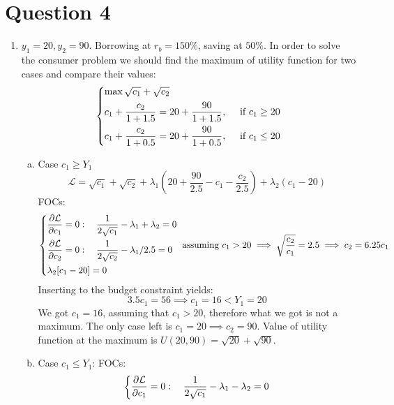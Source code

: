 \documentclass[11pt, oneside]{article}
\begin{document}
\clearpage
\section*{Question 4}
\begin{enumerate}[(1)] 
	\item $ y_{1} = 20, y_{2} = 90 $. Borrowing at $ r_{b} = 150\%$, saving at $ 50\% $.
	In order to solve the consumer problem we should find the maximum of utility function for two cases and compare their values:
	\[
	\begin{dcases}
		\max \sqrt{c_{1}} + \sqrt{c_{2}} \\
		c_{1} + \frac{c_{2}}{1+1.5} = 20 + \frac{90}{1+1.5}, \quad \text{ if } c_{1} \ge 20 \\
		c_{1} + \frac{c_{2}}{1+0.5} = 20 + \frac{90}{1+0.5}, \quad \text{ if } c_{1} \le 20
	\end{dcases} 
	\]
	\begin{enumerate}[(a)]
		\item Case $ c_{1} \ge Y_{1} $
		\[
		\mathcal{L} = \sqrt{c_{1}} + \sqrt{c_{2}} + \lambda_{1} \left( 20 + \frac{90}{2.5} - c_{1} - \frac{c_{2}}{2.5}  \right) + \lambda_{2}(c_{1} - 20)
		\]
		FOCs:
		\[
		\begin{dcases}
			\frac{\partial \mathcal{L}}{\partial c_{1}} = 0: \quad \frac{1}{2\sqrt{c_{1}}} - \lambda_{1} + \lambda_{2} = 0
			\\
			\frac{\partial \mathcal{L}}{\partial c_{2}} = 0: \quad  
			\frac{1}{2\sqrt{c_{2}}} - \lambda_{1} / 2.5 = 0 \\
			\lambda_{2}[c_{1} - 20] = 0
		\end{dcases} \text{ assuming } c_{1} > 20\implies \sqrt{\frac{c_{2}}{c_{1}}} = 2.5 \implies c_{2} = 6.25c_{1}
		\]
		Inserting to the budget constraint yields:
		\[
		3.5c_{1} = 56 \implies c_{1} = 16 < Y_{1} = 20
		\]
		We got $ c_{1} = 16 $, assuming that $ c_{1} > 20 $, therefore what we got is not a maximum. The only case left is $ c_{1} = 20  \implies c_{2} = 90$. Value of utility function at the maximum is $ U(20, 90)  = \sqrt{20} + \sqrt{90}$.
		\item Case $ c_{1} \le Y_{1} $:
		FOCs:
		\[
		\begin{dcases}
			\frac{\partial \mathcal{L}}{\partial c_{1}} = 0: \quad \frac{1}{2\sqrt{c_{1}}} - \lambda_{1} - \lambda_{2}  = 0

\end{dcases}\]
\end{enumerate}
\end{enumerate}
\end{document}
